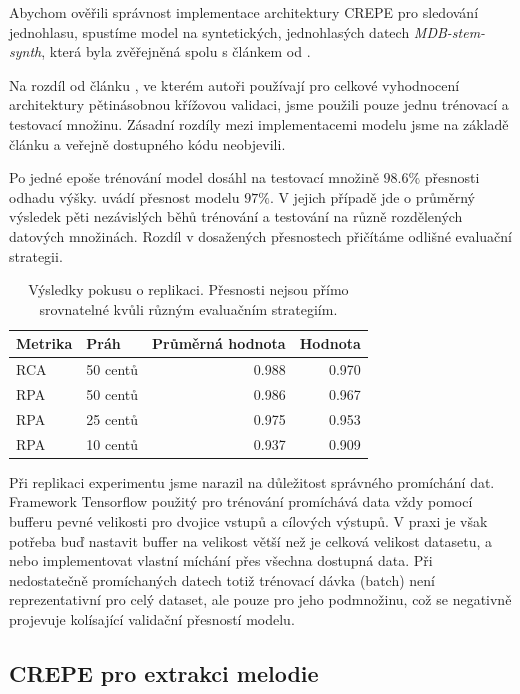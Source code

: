 Abychom ověřili správnost implementace architektury CREPE pro sledování jednohlasu, spustíme model na syntetických, jednohlasých datech \emph{MDB-stem-synth}, která byla zvěřejněná spolu s článkem od \cite{Salamon2017}.

Na rozdíl od článku \cite{Kim2018}, ve kterém autoři používají pro celkové vyhodnocení architektury pětinásobnou křížovou validaci, jsme použili pouze jednu trénovací a testovací množinu. Zásadní rozdíly mezi implementacemi modelu jsme na základě článku a veřejně dostupného kódu neobjevili.

Po jedné epoše trénování model dosáhl na testovací množině $98.6\%$ přesnosti odhadu výšky. \cite{Kim2018} uvádí přesnost modelu $97\%$. V jejich případě jde o průměrný výsledek pěti nezávislých běhů trénování a testování na různě rozdělených datových množinách. Rozdíl v dosažených přesnostech přičítáme odlišné evaluační strategii.

\begin{table}[h!]

\centering
    \begin{tabular}{llrr}
    \toprule
    Metrika & Práh & Průměrná hodnota & Hodnota \cite{Kim2018} \\
    \midrule
    RCA & 50 centů & 0.988 & 0.970 \\
    RPA  & 50 centů & 0.986 & 0.967 \\
    RPA  & 25 centů & 0.975 & 0.953 \\
    RPA  & 10 centů & 0.937 & 0.909 \\
    \bottomrule
    \end{tabular}
\caption{Výsledky pokusu o replikaci. Přesnosti nejsou přímo srovnatelné kvůli různým evaluačním strategiím.}\label{tab:crepe_dimensions}

\end{table}


Při replikaci experimentu jsme narazil na důležitost správného promíchání dat. Framework Tensorflow použitý pro trénování promíchává data vždy pomocí bufferu pevné velikosti pro dvojice vstupů a cílových výstupů. V praxi je však potřeba buď nastavit buffer na velikost větší než je celková velikost datasetu, a nebo implementovat vlastní míchání přes všechna dostupná data. Při nedostatečně promíchaných datech totiž trénovací dávka (batch) není reprezentativní pro celý dataset, ale pouze pro jeho podmnožinu, což se negativně projevuje kolísající validační přesností modelu.

\subsection{CREPE pro extrakci melodie}

